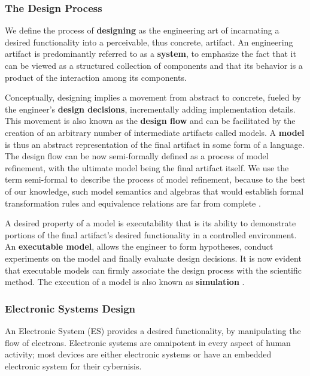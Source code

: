 \documentclass[11pt]{article}
\begin{document}
\subsubsection{The Design Process}
\label{sec:orgfef0ea9}
We define the process of \textbf{designing} as the engineering art of incarnating a desired functionality into a perceivable, thus concrete, artifact.
An engineering artifact is predominantly referred to as a \textbf{system}, 
to emphasize the fact that it can be viewed as a structured collection of components and that its behavior is a product of the interaction among its components.

Conceptually, designing implies a movement from abstract to concrete, fueled by the engineer's \textbf{design decisions}, incrementally adding implementation details.
This movement is also known as the \textbf{design flow} and can be facilitated by the creation of an arbitrary number of intermediate artifacts called models.
A \textbf{model} is thus an abstract representation of the final artifact in some form of a language.
The design flow can be now semi-formally defined as a process of model refinement, with the ultimate model being the final artifact itself.
We use the term semi-formal to describe the process of model refinement, because to the best of our knowledge, 
such model semantics and algebras that would establish formal transformation rules and equivalence relations are far from complete \cite{Gajski2009}.

A desired property of a model is executability that is its ability to demonstrate portions of the final artifact's desired functionality in a controlled environment.
An \textbf{executable model}, allows the engineer to form hypotheses, conduct experiments on the model and finally evaluate design decisions.
It is now evident that executable models can firmly associate the design process with the scientific method.
The execution of a model is also known as \textbf{simulation} \cite{Editor2014}.



\subsubsection{Electronic Systems Design}
\label{sec:org7b324cc}
An Electronic System (ES) provides a desired functionality, by manipulating the flow of electrons.
Electronic systems are omnipotent in every aspect of human activity; 
most devices are either electronic systems or have an embedded electronic system for their cybernisis.
\end{document}
